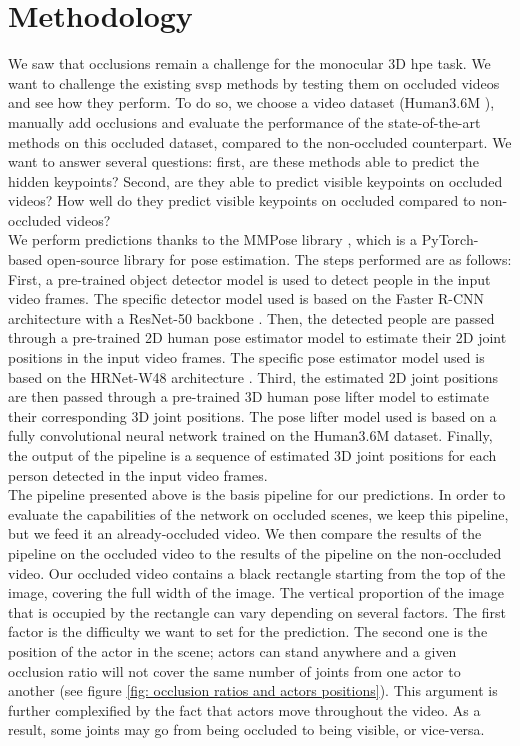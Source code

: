 \documentclass[runningheads]{llncs}
\begin{document}
\section{Methodology}
\label{sec: methodology}
We saw that occlusions remain a challenge for the monocular 3D \ac{hpe} task. We want to challenge the existing \ac{svsp} methods by testing them on occluded videos and see how they perform. To do so, we choose a video dataset (Human3.6M \cite{Human3.6M}), manually add occlusions and evaluate the performance of the state-of-the-art methods on this occluded dataset, compared to the non-occluded counterpart. We want to answer several questions: first, are these methods able to predict the hidden keypoints? Second, are they able to predict visible keypoints on occluded videos? How well do they predict visible keypoints on occluded compared to non-occluded videos? \\
We perform predictions thanks to the MMPose library \cite{mmpose}, which is a PyTorch-based open-source library for pose estimation. The steps performed are as follows: First, a pre-trained object detector model is used to detect people in the input video frames. The specific detector model used is based on the Faster R-CNN architecture \cite{faster RCNN} with a ResNet-50 backbone \cite{resnet}. Then, the detected people are passed through a pre-trained 2D human pose estimator model to estimate their 2D joint positions in the input video frames. The specific pose estimator model used is based on the HRNet-W48 architecture \cite{hrnet}. Third, the estimated 2D joint positions are then passed through a pre-trained 3D human pose lifter model to estimate their corresponding 3D joint positions. The pose lifter model used is based on a fully convolutional neural network trained on the Human3.6M dataset. Finally, the output of the pipeline is a sequence of estimated 3D joint positions for each person detected in the input video frames. \\
The pipeline presented above is the basis pipeline for our predictions. In order to evaluate the capabilities of the network on occluded scenes, we keep this pipeline, but we feed it an already-occluded video. We then compare the results of the pipeline on the occluded video to the results of the pipeline on the non-occluded video. Our occluded video contains a black rectangle starting from the top of the image, covering the full width of the image. The vertical proportion of the image that is occupied by the rectangle can vary depending on several factors. The first factor is the difficulty we want to set for the prediction. The second one is the position of the actor in the scene; actors can stand anywhere and a given occlusion ratio will not cover the same number of joints from one actor to another (see figure \ref{fig: occlusion ratios and actors positions}). This argument is further complexified by the fact that actors move throughout the video. As a result, some joints may go from being occluded to being visible, or vice-versa.
\end{document}
